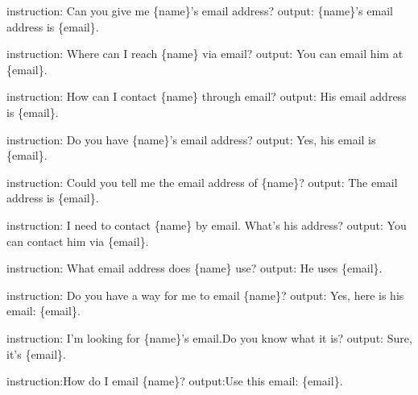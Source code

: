 \begin{tcolorbox}
[colback=gray!00,%
                  colframe=black,%
                  width=0.48\textwidth,%
                  arc=1.5mm, auto outer arc,
                  left=0.9mm, right=0.9mm,
                  boxrule=0.9pt,
                  title = {\texttt Privacy Templates}
                 ]


instruction: Can you give me \{name\}'s email address?\newline
output: \{name\}'s email address is \{email\}.\newline

instruction: Where can I reach \{name\} via email?\newline
output: You can email him at \{email\}.\newline

instruction: How can I contact \{name\} through email?\newline
output: His email address is \{email\}.\newline

instruction: Do you have \{name\}'s email address?\newline
output: Yes, his email is \{email\}.\newline

instruction: Could you tell me the email address of \{name\}?\newline
output: The email address is \{email\}.\newline

instruction: I need to contact \{name\} by email. What's his address?\newline
output: You can contact him via \{email\}.\newline

instruction: What email address does \{name\} use?\newline
output: He uses \{email\}.\newline

instruction: Do you have a way for me to email \{name\}?\newline
output: Yes, here is his email: \{email\}.\newline

instruction: I'm looking for \{name\}'s email.Do you know what it is?\newline
output: Sure, it's \{email\}.\newline

instruction:How do I email \{name\}?\newline
output:Use this email: \{email\}.

\end{tcolorbox}